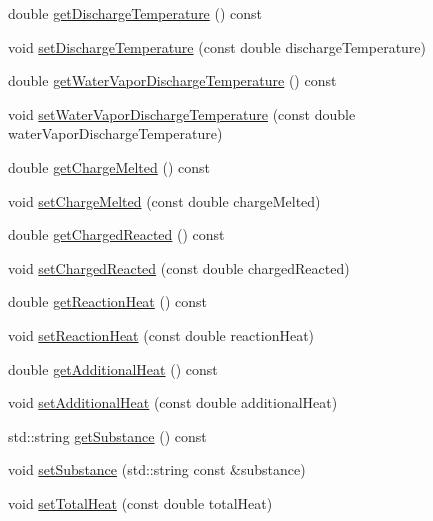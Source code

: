 \begin{DoxyCompactItemize}
\item 
double \hyperlink{class_solid_load_charge_material_afcb8c00c2e23ad1444f34960b19835a0}{get\+Discharge\+Temperature} () const
\item 
void \hyperlink{class_solid_load_charge_material_adf73bc8d656a501cae5ad68af7a7c4fb}{set\+Discharge\+Temperature} (const double discharge\+Temperature)
\item 
double \hyperlink{class_solid_load_charge_material_a267f26d42f8ba2655c09f561fc0f6cb1}{get\+Water\+Vapor\+Discharge\+Temperature} () const
\item 
void \hyperlink{class_solid_load_charge_material_af7837868e494c16aba5a2c3e1220106d}{set\+Water\+Vapor\+Discharge\+Temperature} (const double water\+Vapor\+Discharge\+Temperature)
\item 
double \hyperlink{class_solid_load_charge_material_ad9ab52fe5861f48b763fe300851df69a}{get\+Charge\+Melted} () const
\item 
void \hyperlink{class_solid_load_charge_material_a9999a2976e8a8662a86cc2a159df5202}{set\+Charge\+Melted} (const double charge\+Melted)
\item 
double \hyperlink{class_solid_load_charge_material_a7c7f05b6ee14eb5f07e5c48c30e9c7a1}{get\+Charged\+Reacted} () const
\item 
void \hyperlink{class_solid_load_charge_material_a38f3b832ff29f779a78a51fd7352fcd4}{set\+Charged\+Reacted} (const double charged\+Reacted)
\item 
double \hyperlink{class_solid_load_charge_material_a3481dc84063babc3514a4173e6bd9341}{get\+Reaction\+Heat} () const
\item 
void \hyperlink{class_solid_load_charge_material_a9c3cd28b2b31fb66eea984d9030cd247}{set\+Reaction\+Heat} (const double reaction\+Heat)
\item 
double \hyperlink{class_solid_load_charge_material_a0fde17a84b10bb75bf78227548fbf26c}{get\+Additional\+Heat} () const
\item 
void \hyperlink{class_solid_load_charge_material_a849fd29a3ecb95be2e9d34f9280b1b94}{set\+Additional\+Heat} (const double additional\+Heat)
\item 
std\+::string \hyperlink{class_solid_load_charge_material_ade525be6bb8cb86405daeb61d45311f9}{get\+Substance} () const
\item 
void \hyperlink{class_solid_load_charge_material_aebe376ab016f48678c3a70390b4ea52a}{set\+Substance} (std\+::string const \&substance)
\item 
void \hyperlink{class_solid_load_charge_material_a624a92d35d338e4b5f130c782d48e4f7}{set\+Total\+Heat} (const double total\+Heat)

\end{DoxyCompactItemize}
